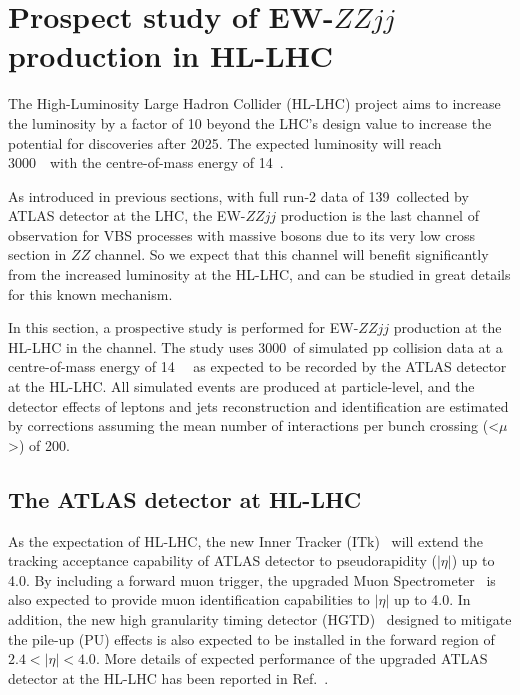 \section{Prospect study of EW-$ZZjj$ production in HL-LHC}

The High-Luminosity Large Hadron Collider (HL-LHC) project aims to increase the luminosity by a factor of 10 beyond the LHC’s design value 
to increase the potential for discoveries after 2025.
The expected luminosity will reach 3000~\ifb~with the centre-of-mass energy of 14~\tev.

As introduced in previous sections, with full run-2 data of 139~\ifb collected by ATLAS detector at the LHC, 
the EW-$ZZjj$ production is the last channel of observation for VBS processes with massive bosons 
due to its very low cross section in $ZZ$ channel.
So we expect that this channel will benefit significantly from the increased luminosity at the HL-LHC,
and can be studied in great details for this known mechanism.

In this section, a prospective study is performed for EW-$ZZjj$ production at the HL-LHC in the \llll channel.
The study uses 3000~\ifb of simulated pp collision data at a centre-of-mass energy of 14~\tev~ as expected to be recorded by the ATLAS detector at the HL-LHC.
All simulated events are produced at particle-level, 
and the detector effects of leptons and jets reconstruction and identification are estimated by corrections
assuming the mean number of interactions per bunch crossing (<$\mu$>) of 200.

\subsection{The ATLAS detector at HL-LHC}

As the expectation of HL-LHC, the new Inner Tracker (ITk)~\cite{Collaboration:2285585}
 will extend the tracking acceptance capability of ATLAS detector to pseudorapidity ($|\eta|$) up to 4.0.
By including a forward muon trigger, the upgraded Muon Spectrometer~\cite{Collaboration:2285580} is also expected to provide 
muon identification capabilities to $|\eta|$ up to 4.0.
In addition, the new high granularity timing detector (HGTD)~\cite{Collaboration:2623663} designed to mitigate the pile-up (PU) effects 
is also expected to be installed in the forward region of $2.4 < |\eta| < 4.0$.
More details of expected performance of the upgraded ATLAS detector at the HL-LHC has been reported in Ref.~\cite{ATL-PHYS-PUB-2016-026}.

